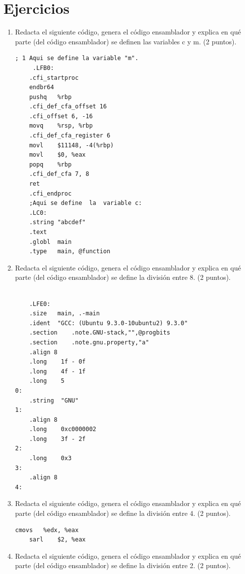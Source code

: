 \documentclass{article}
\begin{document}
	\section{Ejercicios}\label{sec:ejercicios}
	\begin{enumerate}
		\item Redacta el siguiente código, genera el código ensamblador y explica en qué parte (del código
ensamblador) se definen las variables c y m. (2 puntos).
		
        
\begin{lstlisting}[language={[x86masm]Assembler}, basicstyle=\small]    
; 1 Aqui se define la variable "m".
     .LFB0:
	.cfi_startproc
	endbr64
	pushq	%rbp
	.cfi_def_cfa_offset 16
	.cfi_offset 6, -16
	movq	%rsp, %rbp
	.cfi_def_cfa_register 6
	movl	$11148, -4(%rbp)
	movl	$0, %eax
	popq	%rbp
	.cfi_def_cfa 7, 8
	ret
	.cfi_endproc
	;Aqui se define  la  variable c:
	.LC0:
	.string	"abcdef"
	.text
	.globl	main
	.type	main, @function
 \end{lstlisting}	
	
		
		\item Redacta el siguiente código, genera el código ensamblador y explica en qué parte (del código
ensamblador) se define la división entre 8. (2 puntos).


\begin{lstlisting}[language={[x86masm]Assembler}, basicstyle=\small]	
	
	.LFE0:
	.size	main, .-main
	.ident	"GCC: (Ubuntu 9.3.0-10ubuntu2) 9.3.0"
	.section	.note.GNU-stack,"",@progbits
	.section	.note.gnu.property,"a"
	.align 8
	.long	 1f - 0f
	.long	 4f - 1f
	.long	 5
0:
	.string	 "GNU"
1:
	.align 8
	.long	 0xc0000002
	.long	 3f - 2f
2:
	.long	 0x3
3:
	.align 8
4:
 \end{lstlisting}
		\item Redacta el siguiente código, genera el código ensamblador y explica en qué parte (del código
ensamblador) se define la división entre 4. (2 puntos).


\begin{lstlisting}[language={[x86masm]Assembler}, basicstyle=\small]
	cmovs	%edx, %eax
	sarl	$2, %eax
 \end{lstlisting}





		\item  Redacta el siguiente código, genera el código ensamblador y explica en qué parte (del código
ensamblador) se define la división entre 2. (2 puntos).
       

\end{enumerate}
\end{document}
